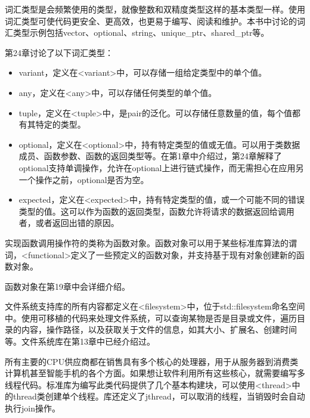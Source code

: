 
词汇类型是会频繁使用的类型，就像整数和双精度类型这样的基本类型一样。使用词汇类型可使代码更安全、更高效，也更易于编写、阅读和维护。本书中讨论的词汇类型示例包括vector、optional、string、unique\_ptr、shared\_ptr等。

第24章讨论了以下词汇类型：

\begin{itemize}
\item
variant，定义在<variant>中，可以存储一组给定类型中的单个值。

\item
any，定义在<any>中，可以存储任何类型的单个值。

\item
tuple，定义在<tuple>中，是pair的泛化。可以存储任意数量的值，每个值都有其特定的类型。

\item
optional，定义在<optional>中，持有特定类型的值或无值。可以用于类数据成员、函数参数、函数的返回类型等。在第1章中介绍过，第24章解释了optional支持单调操作，允许在optional上进行链式操作，而无需担心在应用另一个操作之前，optional是否为空。

\item
expected，定义在<expected>中，持有特定类型的值，或一个可能不同的错误类型的值。这可以作为函数的返回类型，函数允许将请求的数据返回给调用者，或者返回出错的原因。
\end{itemize}



实现函数调用操作符的类称为函数对象。函数对象可以用于某些标准库算法的谓词，<functional>定义了一些预定义的函数对象，并支持基于现有对象创建新的函数对象。

函数对象在第19章中会详细介绍。


文件系统支持库的所有内容都定义在<filesystem>中，位于std::filesystem命名空间中。使用可移植的代码来处理文件系统，可以查询某物是否是目录或文件，遍历目录的内容，操作路径，以及获取关于文件的信息，如其大小、扩展名、创建时间等。文件系统库在第13章中已经介绍过。


所有主要的CPU供应商都在销售具有多个核心的处理器，用于从服务器到消费类计算机甚至智能手机的各个方面。如果想让软件利用所有这些核心，就需要编写多线程代码。标准库为编写此类代码提供了几个基本构建块，可以使用<thread>中的thread类创建单个线程。库还定义了jthread，可以取消的线程，当销毁时会自动执行join操作。

